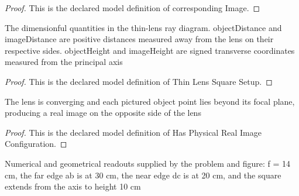 \begin{proof}
  This is the declared model definition of corresponding Image.
\end{proof}
\begin{definition}
  \label{def:physics:phyx-mini-0027:phyxminiproblems-problemphyxmini0027-thinlenssquaresetup}
  The dimensionful quantities in the thin-lens ray diagram. objectDistance and imageDistance are positive distances measured away from the lens on their respective sides. objectHeight and imageHeight are signed transverse coordinates measured from the principal axis
\end{definition}
\begin{proof}
  This is the declared model definition of Thin Lens Square Setup.
\end{proof}
\begin{definition}
  \label{def:physics:phyx-mini-0027:phyxminiproblems-problemphyxmini0027-hasphysicalrealimageconfiguration}
  The lens is converging and each pictured object point lies beyond its focal plane, producing a real image on the opposite side of the lens
\end{definition}
\begin{proof}
  This is the declared model definition of Has Physical Real Image Configuration.
\end{proof}
\begin{definition}
  \label{def:physics:phyx-mini-0027:phyxminiproblems-problemphyxmini0027-matchesfigurereadouts}
  Numerical and geometrical readouts supplied by the problem and figure: f = 14 cm, the far edge ab is at 30 cm, the near edge dc is at 20 cm, and the square extends from the axis to height 10 cm
\end{definition}
